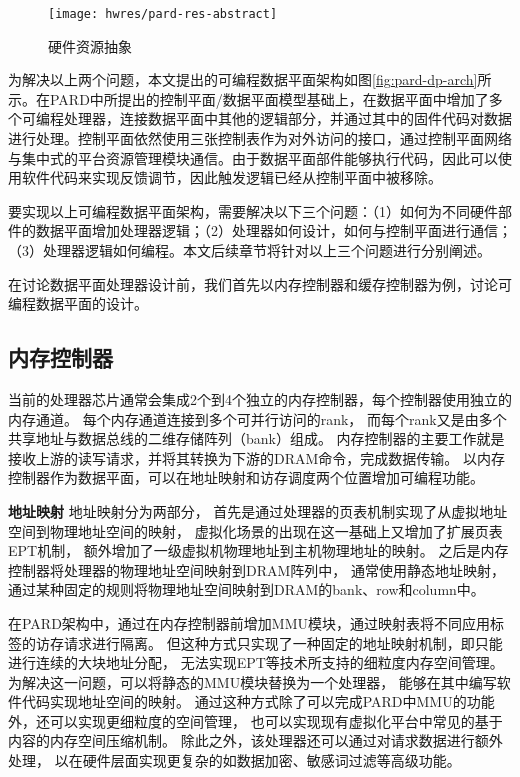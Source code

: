 \begin{figure}[b]
  \centering
  \texttt{[image: hwres/pard-res-abstract]}
  \caption[硬件资源抽象]{硬件资源抽象}
  \label{fig:pard-res-abstract}
\end{figure}

为解决以上两个问题，本文提出的可编程数据平面架构如图\ref{fig:pard-dp-arch}所示。在PARD中所提出的控制平面/数据平面模型基础上，在数据平面中增加了多个可编程处理器，连接数据平面中其他的逻辑部分，并通过其中的固件代码对数据进行处理。控制平面依然使用三张控制表作为对外访问的接口，通过控制平面网络与集中式的平台资源管理模块通信。由于数据平面部件能够执行代码，因此可以使用软件代码来实现反馈调节，因此触发逻辑已经从控制平面中被移除。

%
 
要实现以上可编程数据平面架构，需要解决以下三个问题：（1）如何为不同硬件部件的数据平面增加处理器逻辑；（2）处理器如何设计，如何与控制平面进行通信；（3）处理器逻辑如何编程。本文后续章节将针对以上三个问题进行分别阐述。

在讨论数据平面处理器设计前，我们首先以内存控制器和缓存控制器为例，讨论可编程数据平面的设计。

\subsection{内存控制器}
当前的处理器芯片通常会集成2个到4个独立的内存控制器，每个控制器使用独立的内存通道。
每个内存通道连接到多个可并行访问的rank，
而每个rank又是由多个共享地址与数据总线的二维存储阵列（bank）组成。
内存控制器的主要工作就是接收上游的读写请求，并将其转换为下游的DRAM命令，完成数据传输。
以内存控制器作为数据平面，可以在地址映射和访存调度两个位置增加可编程功能。

\textbf{地址映射}\quad
地址映射分为两部分，
首先是通过处理器的页表机制实现了从虚拟地址空间到物理地址空间的映射，
虚拟化场景的出现在这一基础上又增加了扩展页表EPT机制，
额外增加了一级虚拟机物理地址到主机物理地址的映射。
之后是内存控制器将处理器的物理地址空间映射到DRAM阵列中，
通常使用静态地址映射，通过某种固定的规则将物理地址空间映射到DRAM的bank、row和column中。

在PARD架构中，通过在内存控制器前增加MMU模块，通过映射表将不同应用标签的访存请求进行隔离。
但这种方式只实现了一种固定的地址映射机制，即只能进行连续的大块地址分配，
无法实现EPT等技术所支持的细粒度内存空间管理。
为解决这一问题，可以将静态的MMU模块替换为一个处理器，
能够在其中编写软件代码实现地址空间的映射。
通过这种方式除了可以完成PARD中MMU的功能外，还可以实现更细粒度的空间管理，
也可以实现现有虚拟化平台中常见的基于内容的内存空间压缩机制。
除此之外，该处理器还可以通过对请求数据进行额外处理，
以在硬件层面实现更复杂的如数据加密、敏感词过滤等高级功能。

